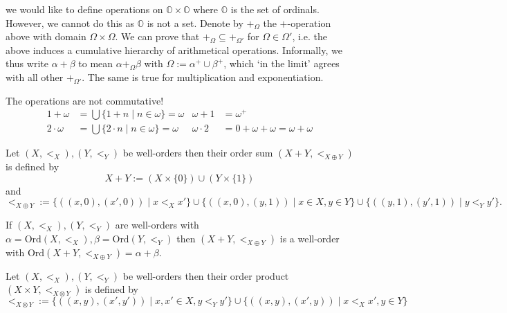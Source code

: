 \documentclass{whrartcl}
\newcommand{\OO}{\mathbb{O}}
\newcommand{\ord}{\text{Ord}}
\begin{document}
\begin{remark}
  we would like to define operations on $\OO \times \OO$ where $\OO$ is the set
  of ordinals. However, we cannot do this as $\OO$ is not a set. Denote by
  $+_\Omega$ the $+$-operation above with domain $\Omega \times
  \Omega$. We can prove that $+_\Omega \subseteq +_{\Omega'}$ for
  $\Omega \in \Omega'$, i.e. the above induces a cumulative hierarchy of
  arithmetical operations. Informally, we thus write $\alpha + \beta$ to mean
  $\alpha +_\Omega \beta$ with $\Omega := \alpha^+ \cup \beta^+$, which `in the
  limit' agrees with all other $+_{\Omega'}$. The same is true for
  multiplication and exponentiation.
\end{remark}

\begin{remark}
  The operations are not commutative!
  \begin{align*}
    1 + \omega &= \bigcup \{1 + n \mid n \in \omega\} = \omega & \omega + 1 &= \omega^+\\
    2 \cdot \omega &= \bigcup \{2 \cdot n \mid n \in \omega\} = \omega & \omega \cdot 2 &= 0 + \omega + \omega = \omega + \omega
  \end{align*}
\end{remark}

\begin{definition}
  Let $(X, <_X), (Y, <_Y)$ be well-orders then their order sum $(X + Y, <_{X \oplus Y})$ is defined by
  \[
    X + Y := (X \times \{0\}) \cup (Y \times \{1\})
  \]
  and
  \[
    <_{X \oplus Y} := \{((x, 0), (x', 0)) \mid x <_X x'\} \cup \{((x, 0), (y,
    1)) \mid x \in X, y \in Y\} \cup \{((y, 1), (y', 1)) \mid y <_Y y'\}.
  \]
\end{definition}

\begin{proposition}
  If $(X, <_X), (Y, <_Y)$ are well-orders with $\alpha = \ord(X, <_X), \beta =
  \ord(Y, <_Y)$ then $(X + Y, <_{X \oplus Y})$ is a well-order with $\ord(X + Y,
  <_{X \oplus Y}) = \alpha + \beta$.
\end{proposition}

\begin{definition}
  Let $(X, <_X), (Y, <_Y)$ be well-orders then their order product $(X \times Y, <_{X \otimes Y})$ is defined by
  \[
    <_{X \otimes Y} := \{((x, y), (x', y')) \mid x, x' \in X, y <_Y y'\} \cup \{((x, y), (x',
    y)) \mid x <_X x', y \in Y\}
  \]
\end{definition}
\end{document}
